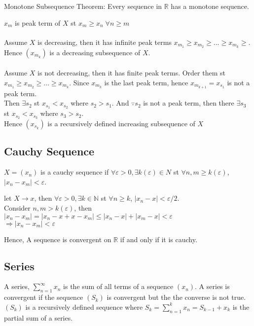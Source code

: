 \documentclass{article}
\begin{document}
Monotone Subsequence Theorem: Every sequence in $\mathbb{R}$ has a monotone sequence.
\begin{tcolorbox}[colback=lightgray!10,colframe=lightgray!10, fontupper=\linespread{1.5}\selectfont]
	$x_m$ is peak term of $X$ st $x_m \geq x_n \; \forall n \geq m$ \\\\	
	Assume $X$ is decreasing, then it has infinite peak terms $x_{m_1} \geq x_{m_2} \geq \dots \geq x_{m_k} \geq$. Hence $(x_{m_k})$ is a decreasing subsequence of $X$. \\\\
	Assume $X$ is not decreasing, then it has finite peak terms. Order them st $x_{m_1} \geq x_{m_2} \geq \dots \geq x_{m_k}$. Since $x_{m_k}$ is the last peak term, hence $x_{m_{k+1}} = x_{s_1}$ is not a peak term. \\
	Then $\exists s_2$ st $x_{s_1} < x_{s_2}$ where $s_2 > s_1$. And $\because s_2$ is not a peak term, then there $\exists s_3$ st $x_{s_2} < x_{s_3}$ where $s_3 > s_2$. \\
	Hence $(x_{s_k})$ is a recursively defined increasing subsequence of $X$	
\end{tcolorbox}

\subsection{Cauchy Sequence}

 $X = (x_n)$ is a cauchy sequence if $\forall \varepsilon > 0, \exists k(\varepsilon) \in N$ st $\forall n,m \geq k(\varepsilon)$, $|x_n-x_m| < \varepsilon$.
\begin{tcolorbox}[colback=lightgray!10,colframe=lightgray!10, fontupper=\linespread{1.5}\selectfont]
	let $X \rightarrow x$, then $\forall \varepsilon > 0, \exists k \in \mathbb{N}$ st $\forall n \geq k$, $|x_n-x| < \varepsilon/2$. \\
	Consider $n,m > k(\varepsilon)$, then $|x_n-x_m| = |x_n-x+x-x_m| \leq |x_n-x| + |x_m-x| < \varepsilon$ \\
	$\Rightarrow |x_n-x_m| < \varepsilon$
\end{tcolorbox}

Hence, A sequence is convergent on $\mathbb{R}$ if and only if it is cauchy.

\subsection{Series}

A series, $\sum_{n=1}^{\infty} x_n$ is the sum of all terms of a sequence $(x_n)$. A series is convergent if the sequence $(S_k)$ is convergent but the the converse is not true. $(S_k)$ is a recursively defined sequence where $S_k = \sum_{n=1}^{k}x_n = S_{k-1} + x_k$ is the partial sum of a series.
\end{document}
